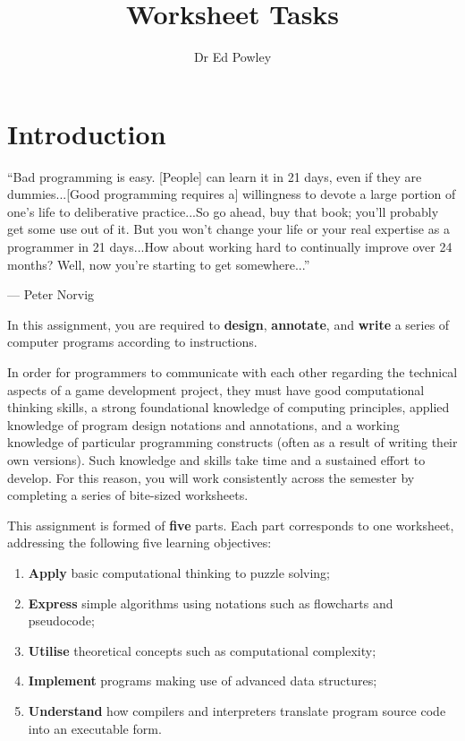 \documentclass{../../fal_assignment}
\title{Worksheet Tasks}
\author{Dr Ed Powley}
\begin{document}
\maketitle

\section*{Introduction}

\begin{marginquote}
``Bad programming is easy. [People] can learn it in 21 days, even if they are dummies...[Good programming requires a] willingness to devote a large portion of one's life to deliberative practice...So go ahead, buy that book; you'll probably get some use out of it. But you won't change your life or your real expertise as a programmer in 21 days...How about working hard to continually improve over 24 months? Well, now you're starting to get somewhere...''
\par --- Peter Norvig
\end{marginquote}

In this assignment, you are required to \textbf{design}, \textbf{annotate}, and \textbf{write} a series of computer programs according to instructions.

In order for programmers to communicate with each other regarding the technical aspects of a game development project, they must have good computational thinking skills, a strong foundational knowledge of computing principles, applied knowledge of program design notations and annotations, and a working knowledge of particular programming constructs (often as a result of writing their own versions). Such knowledge and skills take time and a sustained effort to develop. For this reason, you will work consistently across the semester by completing a series of bite-sized worksheets.

This assignment is formed of \textbf{five} parts.
Each part corresponds to one worksheet, addressing the following five learning objectives:
\begin{enumerate}[label=(\Alph*)]
	\item \textbf{Apply} basic computational thinking to puzzle solving;
	\item \textbf{Express} simple algorithms using notations such as flowcharts and pseudocode;
	\item \textbf{Utilise} theoretical concepts such as computational complexity;
	\item \textbf{Implement} programs making use of advanced data structures;
	\item \textbf{Understand} how compilers and interpreters translate program source code into an executable form.
\end{enumerate}
\end{document}
